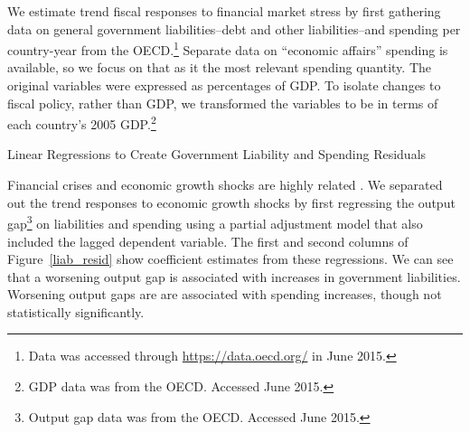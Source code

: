 \documentclass[]{article}
\begin{document}
We estimate trend fiscal responses to financial market stress by first gathering data on general government liabilities--debt and other liabilities--and spending per country-year from the OECD.\footnote{Data was accessed through \url{https://data.oecd.org/} in June 2015.} Separate data on ``economic affairs'' spending is available, so we focus on that as it the most relevant spending quantity. The original variables were expressed as percentages of GDP. To isolate changes to fiscal policy, rather than GDP, we transformed the variables to be in terms of each country's 2005 GDP.\footnote{GDP data was from the OECD. Accessed June 2015.}

\begin{table}
    \caption{Linear Regressions to Create Government Liability and Spending Residuals}
    \label{liab_resid}

    \begin{center}
        
    \end{center}

\end{table}

Financial crises and economic growth shocks are highly related \cite[see][]{Reinhart2009}. We separated out the trend responses to economic growth shocks by first regressing the output gap\footnote{Output gap data was from the OECD. Accessed June 2015.} on liabilities and spending using a partial adjustment model that also included the lagged dependent variable. The first and second columns of Figure~\ref{liab_resid} show coefficient estimates from these regressions. We can see that a worsening output gap is associated with increases in government liabilities. Worsening output gaps are are associated with spending increases, though not statistically significantly.
\end{document}
